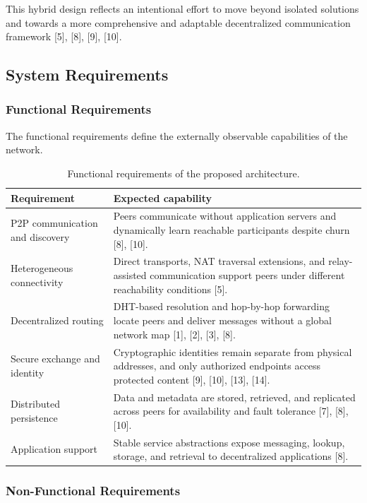\documentclass[12pt,a4paper]{article}
\begin{document}
This hybrid design reflects an intentional effort to move beyond isolated solutions and towards a more comprehensive and adaptable decentralized communication framework [5], [8], [9], [10].

\subsection{System Requirements}
\subsubsection{Functional Requirements}

The functional requirements define the externally observable capabilities of the network.

\begin{table}[H]
\centering
\caption{Functional requirements of the proposed architecture.}
\label{tab:functional-requirements}
\begin{tabularx}{\textwidth}{L{0.27\textwidth} Y}
\toprule
\textbf{Requirement} & \textbf{Expected capability} \\
\midrule
P2P communication and discovery & Peers communicate without application servers and dynamically learn reachable participants despite churn [8], [10]. \\
Heterogeneous connectivity & Direct transports, NAT traversal extensions, and relay-assisted communication support peers under different reachability conditions [5]. \\
Decentralized routing & DHT-based resolution and hop-by-hop forwarding locate peers and deliver messages without a global network map [1], [2], [3], [8]. \\
Secure exchange and identity & Cryptographic identities remain separate from physical addresses, and only authorized endpoints access protected content [9], [10], [13], [14]. \\
Distributed persistence & Data and metadata are stored, retrieved, and replicated across peers for availability and fault tolerance [7], [8], [10]. \\
Application support & Stable service abstractions expose messaging, lookup, storage, and retrieval to decentralized applications [8]. \\
\bottomrule
\end{tabularx}
\end{table}

\subsubsection{Non-Functional Requirements}
\end{document}
